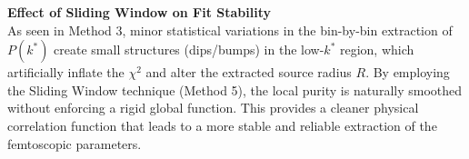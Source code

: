 \documentclass[11pt,a4paper]{article}
\begin{document}
\textbf{Effect of Sliding Window on Fit Stability}\\
As seen in Method 3, minor statistical variations in the bin-by-bin extraction of $P(k^*)$ create small structures (dips/bumps) in the low-$k^*$ region, which artificially inflate the $\chi^2$ and alter the extracted source radius $R$. By employing the Sliding Window technique (Method 5), the local purity is naturally smoothed without enforcing a rigid global function. This provides a cleaner physical correlation function that leads to a more stable and reliable extraction of the femtoscopic parameters.
\end{document}
